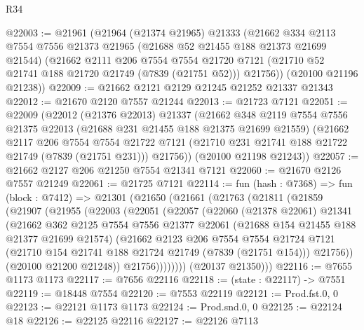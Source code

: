 \begin{lexlean}{R34}
\begin{coremodule}
@22003 := @21961
    (@21964
      (@21374 @21965)
      @21333
      (@21662
        @334
        @2113
        @7554
        @7556
        @21373
        @21965
        (@21688 @52 @21455 @188 @21373 @21699 @21544)
        (@21662
          @2111
          @206
          @7554
          @7554
          @21720
          @7121
          (@21710 @52 @21741 @188 @21720 @21749 (@7839 (@21751 @52)))
          @21756))
      (@20100 @21196 @21238))
@22009 := @21662 @2121 @2129 @21245 @21252 @21337 @21343
@22012 := @21670 @2120 @7557 @21244
@22013 := @21723 @7121
@22051 := @22009
    (@22012
      (@21376 @22013)
      @21337
      (@21662
        @348
        @2119
        @7554
        @7556
        @21375
        @22013
        (@21688 @231 @21455 @188 @21375 @21699 @21559)
        (@21662
          @2117
          @206
          @7554
          @7554
          @21722
          @7121
          (@21710 @231 @21741 @188 @21722 @21749 (@7839 (@21751 @231)))
          @21756))
      (@20100 @21198 @21243))
@22057 := @21662 @2127 @206 @21250 @7554 @21341 @7121
@22060 := @21670 @2126 @7557 @21249
@22061 := @21725 @7121
@22114 := fun (hash : @7368) =>
  fun (block : @7412) =>
  @21301
    (@21650
      (@21661
        (@21763
          (@21811
            (@21859
              (@21907
                (@21955
                  (@22003
                    (@22051
                      (@22057
                        (@22060
                          (@21378 @22061)
                          @21341
                          (@21662
                            @362
                            @2125
                            @7554
                            @7556
                            @21377
                            @22061
                            (@21688 @154 @21455 @188 @21377 @21699 @21574)
                            (@21662
                              @2123
                              @206
                              @7554
                              @7554
                              @21724
                              @7121
                              (@21710 @154 @21741 @188 @21724 @21749 (@7839 (@21751 @154)))
                              @21756))
                          (@20100 @21200 @21248))
                        @21756))))))))
        (@20137 @21350)))
@22116 := @7655 @1173 @1173
@22117 := @7656 @22116
@22118 := (state : @22117) -> @7551
@22119 := @18448 @7554
@22120 := @7553 @22119
@22121 := Prod.fst.{0, 0}
@22123 := @22121 @1173 @1173
@22124 := Prod.snd.{0, 0}
@22125 := @22124 @18
@22126 := @22125 @22116
@22127 := @22126 @7113

\end{coremodule}
\end{lexlean}
